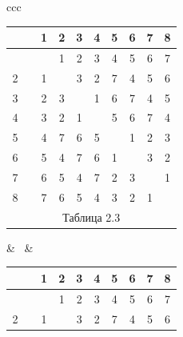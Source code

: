 \begin{center}





\begin{tabular}{ccc}





\begin{tabular}{cccccccccc}


\ & \vline & 1 & 2 & 3 & 4 & 5 & 6 & 7 & 8 \\


\hline


 1 & \vline & \ & 1 & 2 & 3 & 4 & 5 & 6 & 7 \\


2 & \vline & 1 & \ & 3 & 2 & 7 & 4 & 5 & 6 \\


3 & \vline & 2 & 3 & \ & 1 & 6 & 7 & 4 & 5 \\


4 & \vline & 3 & 2 & 1 & \ & 5 & 6 & 7 & 4 \\


5 & \vline & 4 & 7 & 6 & 5 & \ & 1 & 2 & 3 \\


6 & \vline & 5 & 4 & 7 & 6 & 1 & \ & 3 & 2 \\


7 & \vline & 6 & 5 & 4 & 7 & 2 & 3 & \ & 1 \\


8 & \vline & 7 & 6 & 5 & 4 & 3 & 2 & 1 & \ \\


\multicolumn{10}{c}{ Таблица 2.3}


\end{tabular}





& \ & 





\begin{tabular}{cccccccccc}


\ & \vline & 1 & 2 & 3 & 4 & 5 & 6 & 7 & 8 \\


\hline


 1 & \vline & \ & 1 & 2 & 3 & 4 & 5 & 6 & 7 \\


2 & \vline & 1 & \ & 3 & 2 & 7 & 4 & 5 & 6 \\



\end{tabular}
\end{tabular}
\end{center}
